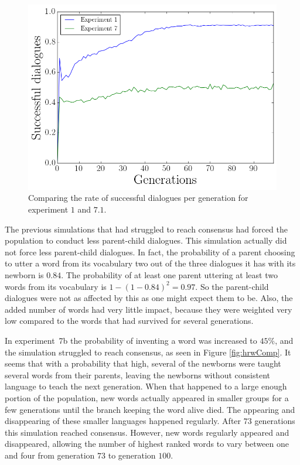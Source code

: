 \begin{figure}
    \centering
    \includegraphics[width=0.7\linewidth]{fig/Discussion/DialogueComparison}
    \caption{Comparing the rate of successful dialogues per generation for experiment $1$ and $7.1$.}
    \label{fig:DialogueComp}
\end{figure}

The previous simulations that had struggled to reach consensus had forced the population to conduct less parent-child dialogues. This simulation actually did not force less parent-child dialogues. In fact, the probability of a parent choosing to utter a word from its vocabulary two out of the three dialogues it has with its newborn is $0.84$. The probability of at least one parent uttering at least two words from its vocabulary is $1 - (1-0.84)^2 = 0.97$. So the parent-child dialogues were not as affected by this as one might expect them to be. Also, the added number of words had very little impact, because they were weighted very low compared to the words that had survived for several generations. 

In experiment~7b the probability of inventing a word was increased to $45\%$, and the simulation struggled to reach consensus, as seen in Figure \ref{fig:hrwComp}. It seems that with a probability that high, several of the newborns were taught several words from their parents, leaving the newborns without consistent language to teach the next generation. When that happened to a large enough portion of the population, new words actually appeared in smaller groups for a few generations until the branch keeping the word alive died. The appearing and disappearing of these smaller languages happened regularly. After $73$ generations this simulation reached consensus. However, new words regularly appeared and disappeared, allowing the number of highest ranked words to vary between one and four from generation $73$ to generation $100$.

